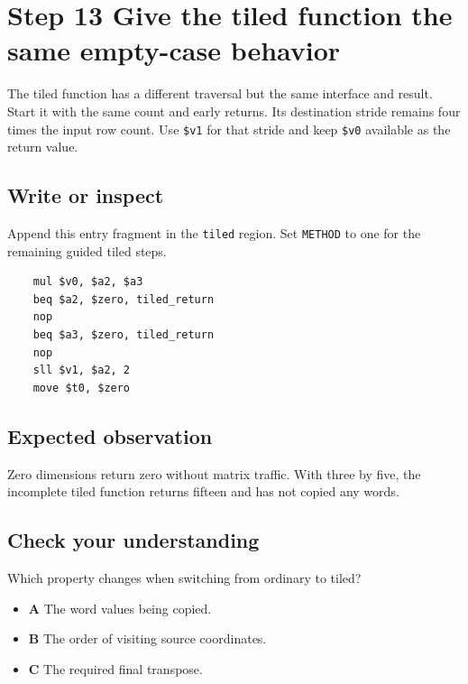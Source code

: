 \section{Step 13 Give the tiled function the same empty-case behavior}\label{transpose-s13}

The tiled function has a different traversal but the same interface and result. Start it with the same count and early returns. Its destination stride remains four times the input row count. Use \texttt{\$v1} for that stride and keep \texttt{\$v0} available as the return value.

\subsection{Write or inspect}
Append this entry fragment in the \texttt{tiled} region. Set \texttt{METHOD} to one for the remaining guided tiled steps.

\begin{verbatim}
    mul $v0, $a2, $a3
    beq $a2, $zero, tiled_return
    nop
    beq $a3, $zero, tiled_return
    nop
    sll $v1, $a2, 2
    move $t0, $zero
\end{verbatim}

\subsection{Expected observation}
Zero dimensions return zero without matrix traffic. With three by five, the incomplete tiled function returns fifteen and has not copied any words.

\subsection{Check your understanding}
Which property changes when switching from ordinary to tiled?

\begin{itemize}
  \item \textbf{A} The word values being copied.
  \item \textbf{B} The order of visiting source coordinates.
  \item \textbf{C} The required final transpose.
\end{itemize}
